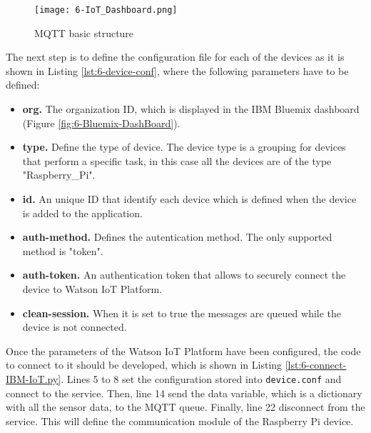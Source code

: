 \begin{figure}[!h]
	\begin{center}
		\texttt{[image: 6-IoT\_Dashboard.png]}
		\caption{MQTT basic structure}
		\label{fig:6-IoT_Dashboard}
	\end{center}
\end{figure}

The next step is to define the configuration file for each of the devices as it is shown in Listing \ref{lst:6-device-conf}, where the following parameters have to be defined:
\begin{itemize}
	\item \textbf{org.} The organization ID, which is displayed in the IBM Bluemix dashboard (Figure \ref{fig:6-Bluemix-DashBoard}).
	\item \textbf{type.} Define the type of device. The device type is a grouping for devices that perform a specific task, in this case all the devices are of the type "Raspberry\_Pi".
	\item \textbf{id.} An unique ID that identify each device which is defined when the device is added to the application.
	\item \textbf{auth-method.} Defines the autentication method. The only supported method is "token".
	\item \textbf{auth-token.} An authentication token that allows to securely connect the device to Watson \ac{IoT} Platform.
	\item \textbf{clean-session.} When it is set to true the messages are queued while the device is not connected.
\end{itemize}



Once the parameters of the Watson \ac{IoT} Platform have been configured, the code to connect to it should be developed, which is shown in Listing \ref{lst:6-connect-IBM-IoT.py}. Lines 5 to 8 set the configuration stored into \texttt{device.conf} and connect to the service. Then, line 14 send the data variable, which is a dictionary with all the sensor data, to the MQTT queue. Finally, line 22 disconnect from the service. This will define the communication module of the Raspberry Pi device.



